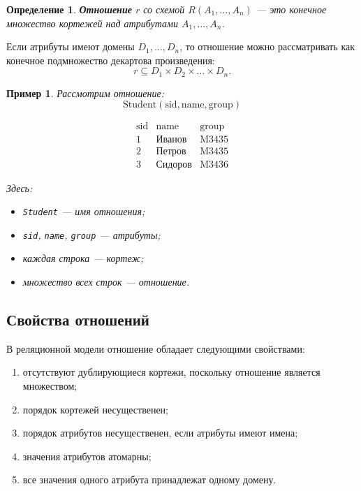 \documentclass[12pt,a4paper]{article}
\newtheorem{definition}{Определение}[section]
\newtheorem{example}{Пример}[section]
\theoremstyle{remark}
\begin{document}
\begin{definition}
\textbf{Отношение} $r$ со схемой $R(A_1,\dots,A_n)$ --- это конечное множество кортежей над атрибутами $A_1,\dots,A_n$.
\end{definition}

Если атрибуты имеют домены $D_1,\dots,D_n$, то отношение можно рассматривать как конечное подмножество декартова произведения:
\[
r \subseteq D_1 \times D_2 \times \dots \times D_n.
\]

\begin{example}
Рассмотрим отношение:
\[
\text{Student}(\text{sid}, \text{name}, \text{group})
\]

\[
\begin{array}{c|c|c}
\text{sid} & \text{name} & \text{group} \\
\hline
1 & \text{Иванов} & \text{M3435} \\
2 & \text{Петров} & \text{M3435} \\
3 & \text{Сидоров} & \text{M3436}
\end{array}
\]

Здесь:
\begin{itemize}
    \item \texttt{Student} --- имя отношения;
    \item \texttt{sid}, \texttt{name}, \texttt{group} --- атрибуты;
    \item каждая строка --- кортеж;
    \item множество всех строк --- отношение.
\end{itemize}
\end{example}

\subsection{Свойства отношений}

В реляционной модели отношение обладает следующими свойствами:
\begin{enumerate}
    \item отсутствуют дублирующиеся кортежи, поскольку отношение является множеством;
    \item порядок кортежей несущественен;
    \item порядок атрибутов несущественен, если атрибуты имеют имена;
    \item значения атрибутов атомарны;
    \item все значения одного атрибута принадлежат одному домену.
\end{enumerate}
\end{document}
